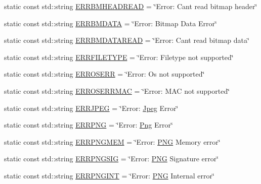 \begin{DoxyCompactItemize}
\item 
static const std\+::string \mbox{\hyperlink{classErrorHandler_ad44dda4b409046f04853a02d460be932}{E\+R\+R\+B\+M\+H\+E\+A\+D\+R\+E\+AD}} = \char`\"{}Error\+: Can\textquotesingle{}t read bitmap header\char`\"{}
\item 
static const std\+::string \mbox{\hyperlink{classErrorHandler_a8aa9a03085699f122048543d17a74796}{E\+R\+R\+B\+M\+D\+A\+TA}} = \char`\"{}Error\+: Bitmap Data Error\char`\"{}
\item 
static const std\+::string \mbox{\hyperlink{classErrorHandler_a0cc80205269faf8ab6a2898627d1d078}{E\+R\+R\+B\+M\+D\+A\+T\+A\+R\+E\+AD}} = \char`\"{}Error\+: Can\textquotesingle{}t read bitmap data\char`\"{}
\item 
static const std\+::string \mbox{\hyperlink{classErrorHandler_abc06f91cc00179b2993cb558770c4d80}{E\+R\+R\+F\+I\+L\+E\+T\+Y\+PE}} = \char`\"{}Error\+: Filetype not supported\char`\"{}
\item 
static const std\+::string \mbox{\hyperlink{classErrorHandler_addc0430f69f200c95ae36b23cd0d10a6}{E\+R\+R\+O\+S\+E\+RR}} = \char`\"{}Error\+: Os not supported\char`\"{}
\item 
static const std\+::string \mbox{\hyperlink{classErrorHandler_a05fc7c7e84ed87c3d91eeb5336a042e3}{E\+R\+R\+O\+S\+E\+R\+R\+M\+AC}} = \char`\"{}Error\+: M\+AC not supported\char`\"{}
\item 
static const std\+::string \mbox{\hyperlink{classErrorHandler_a1f2da6de4d5c03305cb97d742d4fd221}{E\+R\+R\+J\+P\+EG}} = \char`\"{}Error\+: \mbox{\hyperlink{classJpeg}{Jpeg}} Error\char`\"{}
\item 
static const std\+::string \mbox{\hyperlink{classErrorHandler_a8b7f4e33f0118e3a9a49308b8edbb5f3}{E\+R\+R\+P\+NG}} = \char`\"{}Error\+: \mbox{\hyperlink{classPng}{Png}} Error\char`\"{}
\item 
static const std\+::string \mbox{\hyperlink{classErrorHandler_adb02df3c256a08a19be5c1f5a0f3ca08}{E\+R\+R\+P\+N\+G\+M\+EM}} = \char`\"{}Error\+: \mbox{\hyperlink{constants_8h_afac9cfa577b92c66f46f7603f2f9fc14}{P\+NG}} Memory error\char`\"{}
\item 
static const std\+::string \mbox{\hyperlink{classErrorHandler_ad7f59edda1a1c28958eced1bc8bdeab7}{E\+R\+R\+P\+N\+G\+S\+IG}} = \char`\"{}Error\+: \mbox{\hyperlink{constants_8h_afac9cfa577b92c66f46f7603f2f9fc14}{P\+NG}} Signature error\char`\"{}
\item 
static const std\+::string \mbox{\hyperlink{classErrorHandler_a050e436624ffa1bf418075c4d20befe7}{E\+R\+R\+P\+N\+G\+I\+NT}} = \char`\"{}Error\+: \mbox{\hyperlink{constants_8h_afac9cfa577b92c66f46f7603f2f9fc14}{P\+NG}} Internal error\char`\"{}

\end{DoxyCompactItemize}
